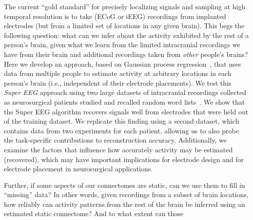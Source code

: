 The current ``gold standard'' for precisely localizing signals and
sampling at high temporal resolution is to take (ECoG or iEEG)
recordings from implanted electrodes (but from a limited set of
locations in any given brain).  This begs the following question: what
can we infer about the activity exhibited by the rest of a person's
brain, given what we learn from the limited intracranial recordings we
have from their brain and additional recordings taken from
\textit{other} people's brains?  Here we develop an approach, based on
Gaussian process regression~\cite{Rasm06}, that uses data from
multiple people to estimate activity at arbitrary
locations in each person's brain (i.e., independent of their electrode
placements).  We test this \textit{Super EEG} approach using two large
datasets of intracranial recordings collected as neurosurgical patients
studied and recalled random word lists~\cite{SedeEtal03, SedeEtal07a,
  SedeEtal07b, MannEtal11, MannEtal12}.  We show that the Super EEG
algorithm recovers signals well from electrodes that were held out of
the training dataset.  We replicate this finding using a second dataset, which contains data from two experiments for each patient, allowing us to also probe the task-specific contributions to reconstruction accuracy.  Additionally, we examine the factors that influence how
accurately activity may be estimated (recovered), which may have important
implications for electrode design and for electrode placement in
neurosurgical applications.

Further, if some aspects of our connectomes are static, can we use them to fill in ``missing'' data?  In other words, given recordings from a subset of brain locations, how reliably can activity patterns from the rest of the brain be inferred using an estimated static connectome?  And to what extent can those 


